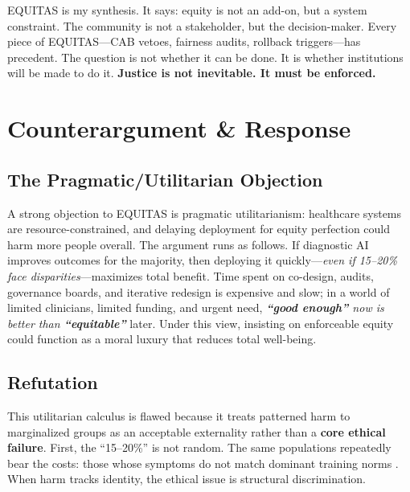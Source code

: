 \documentclass[12pt,a4paper]{article}
\begin{document}
\noindent EQUITAS is my synthesis. It says: equity is not an add-on, but a system constraint. The community is not a stakeholder, but the decision-maker. Every piece of EQUITAS—CAB vetoes, fairness audits, rollback triggers—has precedent. The question is not whether it can be done. It is whether institutions will be made to do it. \textbf{Justice is not inevitable. It must be enforced.}







\newpage
\section{Counterargument \texorpdfstring{\&}{and} Response}

\subsection{The Pragmatic/Utilitarian Objection}
A strong objection to EQUITAS is pragmatic utilitarianism: healthcare systems are resource-constrained, and delaying deployment for equity perfection could harm more people overall. The argument runs as follows. If diagnostic AI improves outcomes for the majority, then deploying it quickly—\textit{even if 15--20\% face disparities}—maximizes total benefit. Time spent on co-design, audits, governance boards, and iterative redesign is expensive and slow; in a world of limited clinicians, limited funding, and urgent need, \textit{\textbf{``good enough''} now is better than \textbf{``equitable''}} later. Under this view, insisting on enforceable equity could function as a moral luxury that reduces total well-being.

\subsection{Refutation}
This utilitarian calculus is flawed because it treats patterned harm to marginalized groups as an acceptable externality rather than a \textbf{core ethical failure}. First, the ``15--20\%'' is not random. The same populations repeatedly bear the costs: those whose symptoms do not match dominant training norms \citep{Marko2025}. When harm tracks identity, the ethical issue is structural discrimination.
\end{document}
